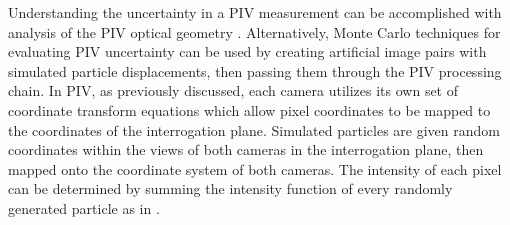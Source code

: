 Understanding the uncertainty in a PIV measurement can be accomplished with 
analysis of the PIV optical geometry \cite{lawson1997b}. Alternatively, Monte 
Carlo techniques for evaluating PIV uncertainty can be used by creating 
artificial image pairs with simulated particle displacements, then passing them 
through the PIV processing chain. In PIV, as previously discussed, each camera 
utilizes its own set of coordinate transform equations which allow pixel 
coordinates to be mapped to the coordinates of the interrogation plane. 
Simulated particles are given random coordinates within the views of both 
cameras in the interrogation plane, then mapped onto the coordinate system of 
both cameras. The intensity of each pixel can be determined by summing the 
intensity function of every randomly generated particle as in 
\cite{adeyinka2005,fouras2007}.




